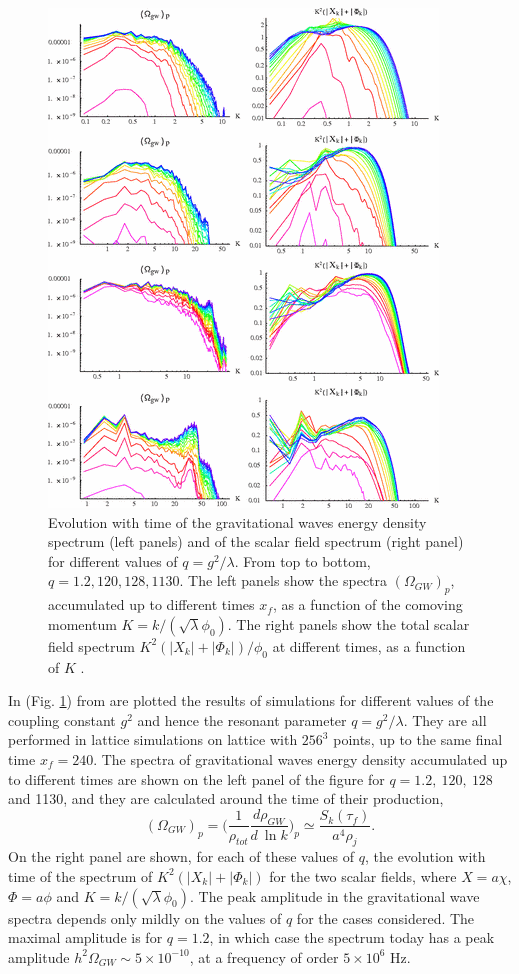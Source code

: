 \documentclass[11pt,a4paper,twoside]{book}
\begin{document}
\begin{figure}
	\centering
	\includegraphics[width=0.65\linewidth, height=0.55\textheight]{Images/Chap7/GreenMethod_Fig8}
	\caption{Evolution with time of the gravitational waves energy density spectrum (left panels) and of the scalar field spectrum (right panel) for different values of $ q=g^{2}/\lambda $. From top to bottom, $ q=1.2,120,128,1130 $. The left panels show  the spectra $ (\Omega_{GW})_{p} $, accumulated up to different times $ x_{f} $, as a function of the comoving momentum $ K=k/(\sqrt{\lambda}\phi_{0}) $. The right panels show the total scalar field spectrum $ K^{2}(|X_{k}| + |\Phi_{k}|)/\phi_{0} $ at different times, as a function of $ K $ \cite{Chap7:GreenMethod}.}
	\label{fig:greenmethodfig8}
\end{figure}

In (Fig. \ref{fig:greenmethodfig8}) from \cite{Chap7:GreenMethod} are plotted the results of simulations for different values of the coupling constant $ g^{2} $ and hence the resonant parameter $ q=g^{2}/\lambda $. They are all performed in lattice simulations on lattice with $ 256^{3} $ points, up to the same final time $ x_{f}=240 $. The spectra of gravitational waves energy density accumulated up to different times are shown on the left panel of the figure for $ q=1.2,\ 120,\ 128 $ and 1130, and they are calculated around the time of their production,
\begin{equation}
(\Omega_{GW})_{p}=\Bigg(\frac{1}{\rho_{tot}}\frac{d\rho_{GW}}{d\ \ln k}\Bigg)_{p} \simeq \frac{S_{k}(\tau_{f})}{a^{4}\rho_{j}}.
\end{equation}
 On the right panel are shown, for each of these values of $ q $, the evolution with time of the spectrum of $ K^{2}(|X_{k}| + |\Phi_{k}|) $ for the two scalar fields, where $ X=a\chi $, $ \Phi=a\phi $ and $ K=k/(\sqrt{\lambda} \phi_{0}) $. The peak amplitude in the gravitational wave spectra depends only mildly on the values of $ q $ for the cases considered. The maximal amplitude is for $ q=1.2 $, in which case the spectrum today has a peak amplitude $ h^{2}\Omega_{GW}\sim 5 \times 10^{-10} $, at a frequency of order $ 5 \times 10^{6} $ Hz. 
 
\end{document}
